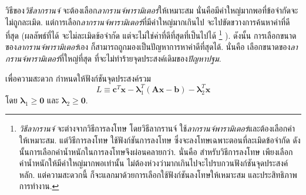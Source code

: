 \begin{Exercise}
วิธีของ\textit{วิธีลากรานจ์} จะต้องเลือก\textit{ลากรานจ์พารามิเตอร์}ให้เหมาะสม
นั่นคือมีค่าใหญ่มากพอที่ข้อจำกัดจะไม่ถูกละเมิด.
แต่การเลือก\textit{ลากรานจ์พารามิเตอร์}ที่มีค่าใหญ่มากเกินไป จะไปขัดขวางการค้นหาค่าที่ดีที่สุด (ผลลัพธ์ที่ได้ จะไม่ละเมิดข้อจำกัด แต่จะไม่ใช่ค่าที่ดีที่สุดที่เป็นไปได้%
\footnote{%
\textit{วิธีลากรานจ์} จะต่างจากวิธีการลงโทษ
โดยวิธีลากรานจ์ ใช้\textit{ลากรานจ์พารามิเตอร์}และต้องเลือกค่าให้เหมาะสม.
แต่วิธีการลงโทษ ใช้ฟังก์ชันการลงโทษ ซึ่งจะลงโทษเฉพาะตอนที่ละเมิดข้อจำกัด
ดังนั้นการเลือกค่าน้ำหนักในการลงโทษจึงผ่อนคลายกว่า.
นั่นคือ สำหรับวิธีการลงโทษ 
เพียงเลือกค่าน้ำหนักให้มีค่าใหญ่มากพอเท่านั้น ไม่ต้องห่วงว่ามากเกินไปจะไปรบกวนฟังก์ชันจุดประสงค์หลัก.
แต่ความสะดวกนี้ ก็จะแลกมาด้วยการเลือกใช้ฟังก์ชันลงโทษให้เหมาะสม และประสิทธิภาพการทำงาน.
}%
).
ดังนั้น 
การเลือกขนาดของ\textit{ลากรานจ์พารามิเตอร์}เอง ก็สามารถถูกมองเป็นปัญหาการหาค่าดีที่สุดได้.
นั่นคือ เลือกขนาดของ\textit{ลากรานจ์พารามิเตอร์}ที่ใหญ่ที่สุด ที่จะไม่ทำร้ายจุดประสงค์เดิมของ\textit{ปัญหาปฐม}.



เพื่อความสะดวก กำหนดให้ฟังก์ชันจุดประสงค์รวม 
\[
L \equiv \bm{c}^T \bm{x} 
- \bm{\lambda}_1^T (\bm{A} \bm{x} - \bm{b})
- \bm{\lambda}_2^T \bm{x}
\]
โดย $\bm{\lambda}_1 \geq \bm{0}$ และ $\bm{\lambda}_2 \geq \bm{0}$.


\end{Exercise}
